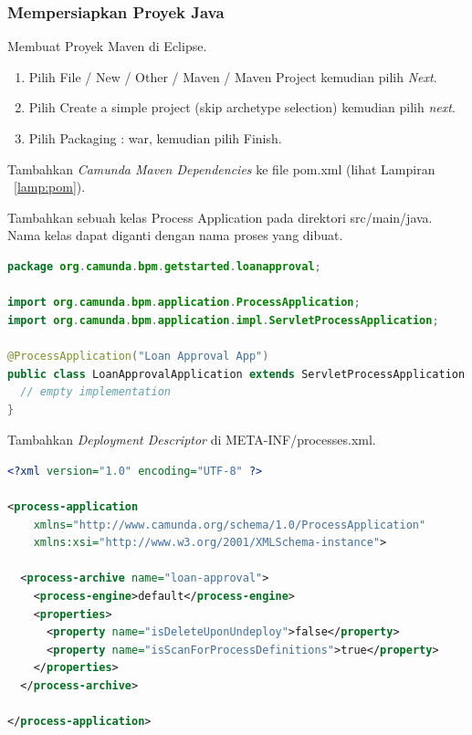 \subsubsection{Mempersiapkan Proyek Java}
\begin{description}
	\item Membuat Proyek Maven di Eclipse. 
		\begin{enumerate}
			\item Pilih File / New / Other / Maven / Maven Project kemudian pilih \textit{Next}.
			\item Pilih Create a simple project (skip archetype selection) kemudian pilih \textit{next}.
			\item Pilih Packaging : war, kemudian pilih Finish.
		\end{enumerate}
	\item Tambahkan \textit{Camunda Maven Dependencies} ke file pom.xml (lihat Lampiran ~\ref{lamp:pom}).
	\item Tambahkan sebuah kelas Process Application pada direktori src/main/java. Nama kelas dapat diganti dengan nama proses yang dibuat. 
	\begin{lstlisting}[language=java,basicstyle=\tiny,caption=Kelas Process Application]
	package org.camunda.bpm.getstarted.loanapproval;

import org.camunda.bpm.application.ProcessApplication;
import org.camunda.bpm.application.impl.ServletProcessApplication;

@ProcessApplication("Loan Approval App")
public class LoanApprovalApplication extends ServletProcessApplication {
  // empty implementation
}
	\end{lstlisting}
	\item Tambahkan \textit{Deployment Descriptor} di META-INF/processes.xml.
	
	\begin{lstlisting}[language=xml,basicstyle=\tiny,caption=processes.xml]	
	<?xml version="1.0" encoding="UTF-8" ?>

<process-application
    xmlns="http://www.camunda.org/schema/1.0/ProcessApplication"
    xmlns:xsi="http://www.w3.org/2001/XMLSchema-instance">

  <process-archive name="loan-approval">
    <process-engine>default</process-engine>
    <properties>
      <property name="isDeleteUponUndeploy">false</property>
      <property name="isScanForProcessDefinitions">true</property>
    </properties>
  </process-archive>

</process-application>
	\end{lstlisting}
	
	
\end{description}

